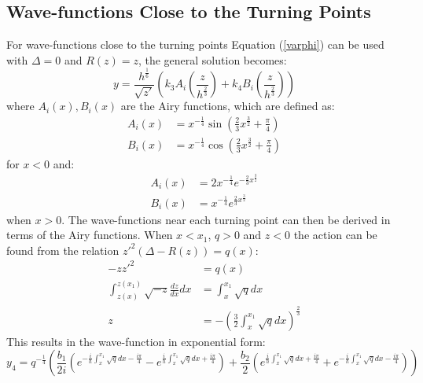		\subsection{Wave-functions Close to the Turning Points}
		\label{Appendix - Wave-functions Close to the Turning Points}
		For wave-functions close to the turning points Equation (\ref{varphi}) can be used with $\Delta=0$ and $R\left(z\right)=z$, the general solution becomes:
		\begin{equation}
			y=\frac{h^{\frac{1}{6}}}{\sqrt{z'}}\left(k_{3}A_{i}\left(\frac{z}{h^{\frac{2}{3}}}\right)+k_{4}B_{i}\left(\frac{z}{h^{\frac{2}{3}}}\right)\right)
		\end{equation}
		where $A_{i}\left(x\right), B_{i}\left(x\right)$ are the Airy functions, which are defined as:
		\begin{align}
			A_{i}\left(x\right)&=x^{-\frac{1}{4}}\sin\left(\frac{2}{3}x^{\frac{3}{2}}+\frac{\pi}{4}\right)\\
			B_{i}\left(x\right)&=x^{-\frac{1}{4}}\cos\left(\frac{2}{3}x^{\frac{3}{2}}+\frac{\pi}{4}\right)
		\end{align}
		for $x<0$ and:
		\begin{align}
			A_{i}\left(x\right)&=2x^{-\frac{1}{4}}e^{-\frac{2}{3}x^{\frac{3}{2}}}\\
			B_{i}\left(x\right)&=x^{-\frac{1}{4}}e^{\frac{2}{3}x^{\frac{3}{2}}}
		\end{align}
		when $x>0$. The wave-functions near each turning point can then be derived in terms of the Airy functions. When $x<x_{1}$, $ q>0$ and $ z<0$ the action can be found from the relation $z'^{2}\left(\Delta-R\left(z\right)\right)=q\left(x\right)$:
		\begin{align}
			-zz'^{2}&=q\left(x\right)\\
			\int_{z\left(x\right)}^{z\left(x_{1}\right)} \sqrt{-z} \frac{dz}{dx}dx&=\int_{x}^{x_{1}}\sqrt{q}dx\\
			z&=-\left(\frac{3}{2}\int_{x}^{x_{1}}\sqrt{q}dx\right)^{\frac{2}{3}}
		\end{align}
		This results in the wave-function in exponential form: 
		\begin{equation}
			y_{4}=q^{-\frac{1}{4}}\left(\frac{b_{1}}{2i}\left(e^{-\frac{i}{h}\int_{x}^{x_{1}} \sqrt{q}dx -\frac{i\pi}{4}}-e^{\frac{i}{h}\int_{x}^{x_{1}}\sqrt{q}dx +\frac{i\pi}{4}}\right)+\frac{b_{2}}{2}\left(e^{\frac{i}{h}\int_{x}^{x_{1}}\sqrt{q}dx +\frac{i\pi}{4}}+e^{-\frac{i}{h}\int_{x}^{x_{1}}\sqrt{q}dx-\frac{i\pi}{4}}\right)\right)
		\end{equation}
